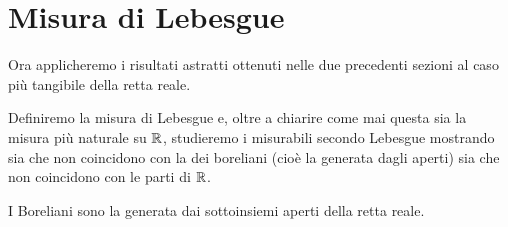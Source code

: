 \section{Misura di Lebesgue}
Ora applicheremo i risultati astratti ottenuti nelle due precedenti sezioni al caso più tangibile della retta reale.

Definiremo la misura di Lebesgue e, oltre a chiarire come mai questa sia la misura più naturale su $\mathbb R$, studieremo i misurabili secondo Lebesgue mostrando sia che non coincidono con la \sigalg{} dei boreliani (cioè la \sigalg{} generata dagli aperti) sia che non coincidono con le parti di $\mathbb R$.

\begin{definition}
	I Boreliani sono la \sigalg{} generata dai sottoinsiemi aperti della retta reale.
\end{definition}

